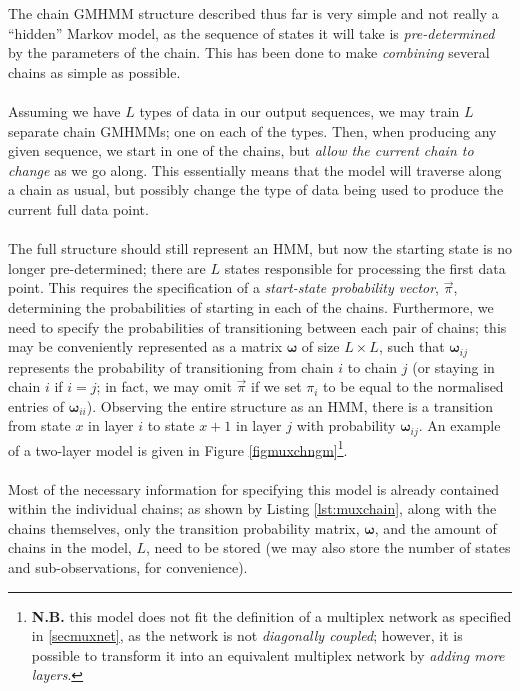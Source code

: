 \documentclass[12pt,a4paper,twoside,openright]{report}
\begin{document}
The chain GMHMM structure described thus far is very simple and not really a ``hidden'' Markov model, as the sequence of states it will take is \emph{pre-determined} by the parameters of the chain. This has been done to make \emph{combining} several chains as simple as possible.\\ \\
Assuming we have $L$ types of data in our output sequences, we may train $L$ separate chain GMHMMs; one on each of the types. Then, when producing any given sequence, we start in one of the chains, but \emph{allow the current chain to change} as we go along. This essentially means that the model will traverse along a chain as usual, but possibly change the type of data being used to produce the current full data point. \\ \\
The full structure should still represent an HMM, but now the starting state is no longer pre-determined; there are $L$ states responsible for processing the first data point. This requires the specification of a \emph{start-state probability vector}, $\vec{\pi}$, determining the probabilities of starting in each of the chains. Furthermore, we need to specify the probabilities of transitioning between each pair of chains; this may be conveniently represented as a matrix ${\boldsymbol \omega}$ of size $L \times L$, such that ${\boldsymbol \omega}_{ij}$ represents the probability of transitioning from chain $i$ to chain $j$ (or staying in chain $i$ if $i = j$; in fact, we may omit $\vec{\pi}$ if we set $\pi_i$ to be equal to the normalised entries of ${\boldsymbol \omega}_{ii}$). Observing the entire structure as an HMM, there is a transition from state $x$ in layer $i$ to state $x+1$ in layer $j$ with probability ${\boldsymbol \omega}_{ij}$. An example of a two-layer model is given in Figure \ref{figmuxchngm}\footnote{{\bf N.B.} this model does not fit the definition of a multiplex network as specified in \cref{secmuxnet}, as the network is not \emph{diagonally coupled}; however, it is possible to transform it into an equivalent multiplex network by \emph{adding more layers}.}.\\ \\
Most of the necessary information for specifying this model is already contained within the individual chains; as shown by Listing \ref{lst:muxchain}, along with the chains themselves, only the transition probability matrix, $\boldsymbol \omega$, and the amount of chains in the model, $L$, need to be stored (we may also store the number of states and sub-observations, for convenience).
\end{document}
